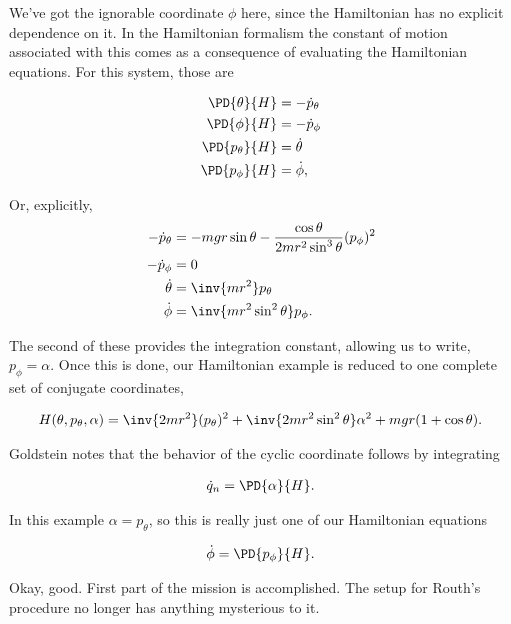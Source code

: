 We've got the ignorable coordinate $\phi$ here, since the Hamiltonian has no explicit dependence on it.  In the Hamiltonian formalism the constant of motion associated with this comes as a consequence of evaluating the Hamiltonian equations.  For this system, those are

\begin{align}\label{eqn:goldsteinRouth:4}
\PD{\theta}{H} &= - \dot{p}_\theta \\
\PD{\phi}{H} &= - \dot{p}_\phi \\
\PD{p_\theta}{H} &= \dot{\theta} \\
\PD{p_\phi}{H} &= \dot{\phi},
\end{align}

Or, explicitly,
\begin{align}\label{eqn:goldsteinRouth:5}
- \dot{p}_\theta &= -m g r \sin\theta - \frac{\cos\theta}{2 m r^2 \sin^3 \theta} (p_\phi)^2  \\
- \dot{p}_\phi &= 0 \\
\dot{\theta} &= \inv{m r^2 } p_\theta \\
\dot{\phi} &= \inv{m r^2 \sin^2 \theta} p_\phi.
\end{align}

The second of these provides the integration constant, allowing us to write, $p_\phi = \alpha$.  Once this is done, our Hamiltonian example is reduced to one complete set of conjugate coordinates,

\begin{align}\label{eqn:goldsteinRouth:6}
H(\theta, p_\theta, \alpha) = \inv{2 m r^2 } (p_\theta)^2 + \inv{2 m r^2 \sin^2\theta} \alpha^2 + m g r ( 1 + \cos\theta ).
\end{align}

Goldstein notes that the behavior of the cyclic coordinate follows by integrating

\begin{align}\label{eqn:goldsteinRouth:7}
\dot{q}_n = \PD{\alpha}{H}.
\end{align}

In this example $\alpha = p_\theta$, so this is really just one of our Hamiltonian equations

\begin{align}\label{eqn:goldsteinRouth:8}
\dot{\phi} = \PD{p_\phi}{H}.
\end{align}

Okay, good.  First part of the mission is accomplished.  The setup for Routh's procedure no longer has anything mysterious to it.

